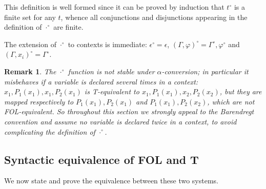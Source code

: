 \documentclass{article}
\newtheorem{remark}[definition]{Remark}
\newcommand{\T}{\textsf T}
\newcommand{\FOL}{\textsf{FOL}}
\newcommand{\ofun}[1]{\ensuremath{{#1}^\circ}}
\newcommand{\omap}{\ofun\cdot}
\begin{document}
This definition is well formed since it can be proved by induction that
{\ofun t} is a finite set for any $t$, whence all conjunctions and
disjunctions appearing in the definition of {\omap} are finite.

The extension of {\omap} to contexts is immediate: $\ofun\epsilon=\epsilon$,
$\ofun{(\Gamma,\varphi)}=\ofun\Gamma,\ofun\varphi$ and
$\ofun{(\Gamma,x_i)}=\ofun\Gamma$.

\begin{remark}\label{remark}
The {\omap} function is not stable under $\alpha$-conversion; in
particular it misbehaves if a variable is declared several times in a
context: $x_1,P_1(x_1),x_1,P_2(x_1)$ is {\T}-equivalent to
$x_1,P_1(x_1),x_2,P_2(x_2)$, but they are mapped respectively to
$P_1(x_1),P_2(x_1)$ and $P_1(x_1),P_2(x_2)$, which are \emph{not}
{\FOL}-equivalent.  So throughout this section we strongly appeal to
the Barendregt convention and assume no variable is declared twice in
a context, to avoid complicating the definition of {\omap}.
\end{remark}

\subsection{Syntactic equivalence of {\FOL} and {\T}}

We now state and prove the equivalence between these two systems.
\end{document}
